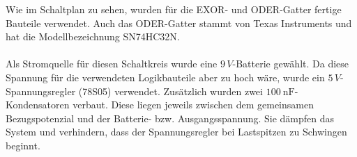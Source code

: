 Wie im Schaltplan zu sehen, wurden für die EXOR- und ODER-Gatter fertige Bauteile verwendet. Auch das ODER-Gatter stammt von Texas Instruments und hat die Modellbezeichnung SN74HC32N.\\\\
Als Stromquelle für diesen Schaltkreis wurde eine $9\,V$-Batterie gewählt. Da diese Spannung für die verwendeten Logikbauteile aber zu hoch wäre, wurde ein $5\,V$-Spannungsregler (78S05) verwendet. Zusätzlich wurden zwei $\SI{100}{\nano\farad}$-Kondensatoren verbaut. Diese liegen jeweils zwischen dem gemeinsamen Bezugspotenzial und der Batterie- bzw. Ausgangsspannung. Sie dämpfen das System und verhindern, dass der Spannungsregler bei Lastspitzen zu Schwingen beginnt.
